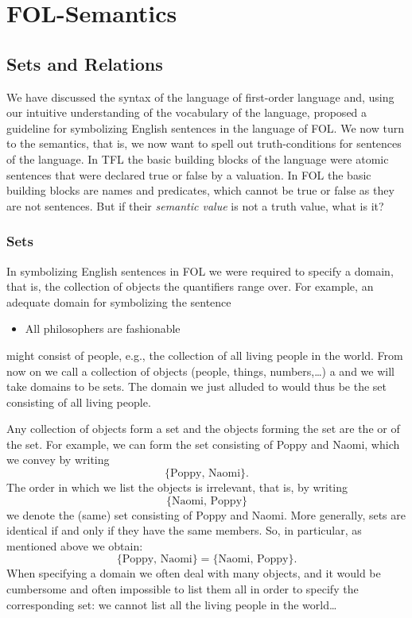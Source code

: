 \part{FOL-Semantics}
\label{ch.semantics}

\chapter{Sets and Relations}
We have discussed the syntax of the language of first-order language and, using our intuitive understanding of the vocabulary of the language, proposed a guideline for symbolizing English sentences in the language of FOL. We now turn to the semantics, that is, we now want to spell out truth-conditions for sentences of the language. In TFL the basic building blocks of the language were atomic sentences that were declared true or false by a valuation. In FOL the basic building blocks are names and predicates, which cannot be true or false as they are not sentences. But if their \emph{semantic value} is not a truth value, what is it?


\section{Sets}
In symbolizing English sentences in FOL we were required to specify a domain, that is, the collection of objects the quantifiers range over. For example, an adequate domain for symbolizing the sentence
\begin{itemize}
\item All philosophers are fashionable
\end{itemize}
might consist of people, e.g.,  the collection of all living people in the world. From now on we call a collection of objects (people, things, numbers,\ldots) a  and we will take domains to be sets. The domain we just alluded to would thus be the set consisting of all living people.

Any collection of objects form a set and the objects forming the set are the  or  of the set. For example, we can form the set consisting of Poppy and Naomi, which we convey by writing
$$\{\text{Poppy, Naomi}\}.$$
The order in which we list the objects is irrelevant, that is, by writing
$$\{\text{Naomi, Poppy}\}$$
we denote the (same) set consisting of Poppy and Naomi. More generally, sets are identical if and only if they have the same members. So, in particular, as mentioned above we obtain:
$$\{\text{Poppy, Naomi}\}=\{\text{Naomi, Poppy}\}.$$  
When specifying a domain we often deal with many objects, and it would be cumbersome and often impossible to list them all in order to specify the corresponding set: we cannot list all the living people in the world\ldots

